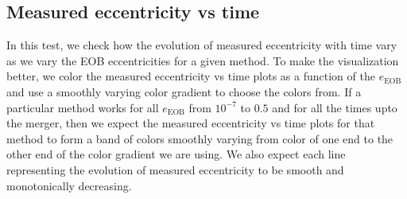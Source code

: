 \documentclass[aps,prd,amsmath,floats,floatfix, twocolumn,
superscriptaddress,nofootinbib,showpacs]{revtex4-1}
\begin{document}
\subsection{Measured eccentricity vs time}
\label{sec:measured-eccentricity-vs-time}
In this test, we check how the evolution of measured eccentricity with time vary as we vary the EOB eccentricities for a given method. To make the visualization better,
we color the measured eccentricity vs time plots as a function of the $e_{\text{EOB}}$ and use a smoothly varying color gradient to choose the colors from. If a particular method
works for all $e_{\text{EOB}}$ from $10^{-7}$ to $0.5$ and for all the times upto the merger, then we expect the measured eccentricity vs time plots for that method to form a band of colors
smoothly varying from color of one end to the other end of the color gradient we are using. We also expect each line representing the evolution of measured eccentricity to be smooth and monotonically
decreasing.
\end{document}
